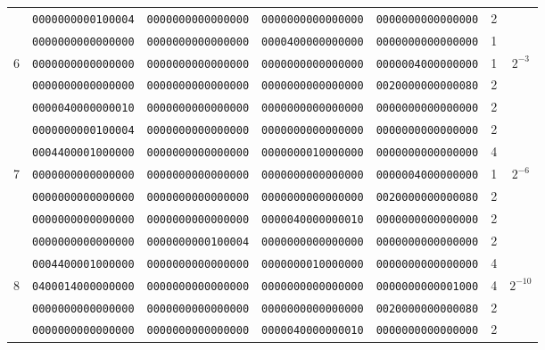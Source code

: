 \begin{table}[!tb]
\begin{center}
{\begin{tabular}{ccccccc}
      & {\tt 0000000000100004} & {\tt 0000000000000000} & {\tt 0000000000000000} & {\tt 0000000000000000} & 2  & \\
      & {\tt 0000000000000000} & {\tt 0000000000000000} & {\tt 0000400000000000} & {\tt 0000000000000000} & 1  & \\
6     & {\tt 0000000000000000} & {\tt 0000000000000000} & {\tt 0000000000000000} & {\tt 0000004000000000} & 1  & $2^{-3}$\\
      & {\tt 0000000000000000} & {\tt 0000000000000000} & {\tt 0000000000000000} & {\tt 0020000000000080} & 2  & \\
      & {\tt 0000040000000010} & {\tt 0000000000000000} & {\tt 0000000000000000} & {\tt 0000000000000000} & 2  & \\ \hline

      & {\tt 0000000000100004} & {\tt 0000000000000000} & {\tt 0000000000000000} & {\tt 0000000000000000} & 2  & \\
      & {\tt 0004400001000000} & {\tt 0000000000000000} & {\tt 0000000010000000} & {\tt 0000000000000000} & 4  & \\
7     & {\tt 0000000000000000} & {\tt 0000000000000000} & {\tt 0000000000000000} & {\tt 0000004000000000} & 1  & $2^{-6}$\\
      & {\tt 0000000000000000} & {\tt 0000000000000000} & {\tt 0000000000000000} & {\tt 0020000000000080} & 2  & \\
      & {\tt 0000000000000000} & {\tt 0000000000000000} & {\tt 0000040000000010} & {\tt 0000000000000000} & 2  & \\ \hline

      & {\tt 0000000000000000} & {\tt 0000000000100004} & {\tt 0000000000000000} & {\tt 0000000000000000} & 2  & \\
      & {\tt 0004400001000000} & {\tt 0000000000000000} & {\tt 0000000010000000} & {\tt 0000000000000000} & 4  & \\
8     & {\tt 0400014000000000} & {\tt 0000000000000000} & {\tt 0000000000000000} & {\tt 0000000000001000} & 4  & $2^{-10}$\\
      & {\tt 0000000000000000} & {\tt 0000000000000000} & {\tt 0000000000000000} & {\tt 0020000000000080} & 2  & \\
      & {\tt 0000000000000000} & {\tt 0000000000000000} & {\tt 0000040000000010} & {\tt 0000000000000000} & 2  & \\ \hline


\end{tabular}}
\end{center}
\end{table}
